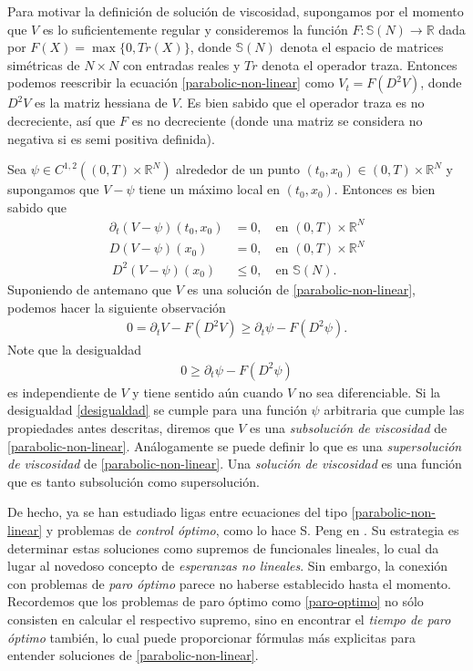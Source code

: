\documentclass{article}
\numberwithin{equation}{section}
\begin{document}
Para motivar la definición de solución de viscosidad, supongamos por el momento que $V$ es lo suficientemente regular y consideremos la función $F : \mathbb{S}(N) \to \mathbb{R}$ dada por $F(X) = \max\{0,Tr(X)\}$, donde $\mathbb{S}(N)$ denota el espacio de matrices simétricas de $N\times N$ con entradas reales y $Tr$ denota el operador traza.  Entonces podemos reescribir la ecuación \eqref{parabolic-non-linear} como $V_t = F(D^2V)$, donde $D^2V$ es la matriz hessiana de $V$. Es bien sabido que el operador traza es no decreciente, así que $F$ es no decreciente (donde una matriz se considera no negativa si es semi positiva definida). 

Sea $\psi \in C^{1,2}((0,T)\times\mathbb{R}^N)$ alrededor de un punto $(t_0,x_0) \in (0,T)\times\mathbb{R}^N$ y supongamos que $V-\psi$ tiene un máximo local en $(t_0,x_0)$. Entonces es bien sabido que
\begin{align*}
    \partial_t(V-\psi)(t_0,x_0) &= 0, \quad \text{en } (0,T)\times\mathbb{R}^N \\
    D(V-\psi)(x_0) &= 0, \quad \text{en }(0,T)\times\mathbb{R}^N \\\
    D^2(V-\psi)(x_0) &\leq 0, \quad \text{en } \mathbb{S}(N).
\end{align*}
Suponiendo de antemano que $V$ es una solución de \eqref{parabolic-non-linear}, podemos hacer la siguiente observación
\begin{align*}
    0 = \partial_tV - F(D^2V) \geq \partial_t\psi - F(D^2\psi).
\end{align*}
Note que la desigualdad 
\begin{align}\label{desigualdad}
0 \geq \partial_t\psi - F(D^2\psi)
\end{align}
es independiente de $V$ y tiene sentido aún cuando $V$ no sea diferenciable. Si la desigualdad \eqref{desigualdad} se cumple para una función $\psi$ arbitraria que cumple las propiedades antes descritas, diremos que $V$ es una \emph{subsolución de viscosidad} de \eqref{parabolic-non-linear}. Análogamente se puede definir lo que es una \emph{supersolución de viscosidad} de \eqref{parabolic-non-linear}. Una \emph{solución de viscosidad} es una función que es tanto subsolución como supersolución. 

De hecho, ya se han estudiado ligas entre ecuaciones del tipo \eqref{parabolic-non-linear} y problemas de \emph{control óptimo}, como lo hace S. Peng en \cite{peng2010nonlinear}. Su estrategia es determinar estas soluciones como supremos de funcionales lineales, lo cual da lugar al novedoso concepto de \emph{esperanzas no lineales}. Sin embargo, la conexión con problemas de \emph{paro óptimo} parece no haberse establecido hasta el momento. Recordemos que los problemas de paro óptimo como \eqref{paro-optimo} no sólo consisten en calcular el respectivo supremo, sino en encontrar el \emph{tiempo de paro óptimo} también, lo cual puede proporcionar fórmulas más explicitas para entender soluciones de  \eqref{parabolic-non-linear}.


 
\end{document}
